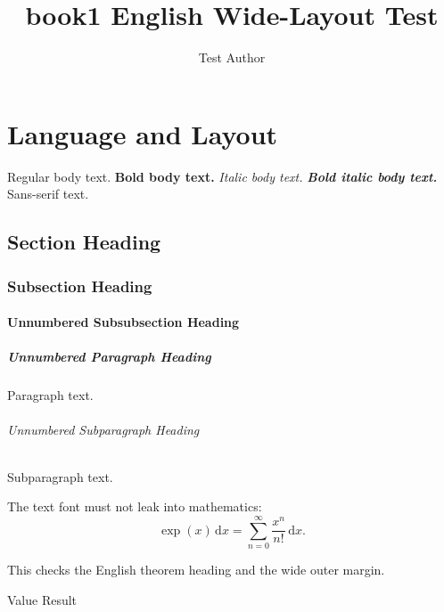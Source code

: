 \documentclass[11pt,a4paper,openright]{book}
\title{book1 English Wide-Layout Test}
\author{Test Author}
\begin{document}
\maketitle
\chapter{Language and Layout}

Regular body text. \textbf{Bold body text.}
\textit{Italic body text.} \textbf{\textit{Bold italic body text.}}
\textsf{Sans-serif text.}

\section{Section Heading}

\subsection{Subsection Heading}

\subsubsection{Unnumbered Subsubsection Heading}

\paragraph{Unnumbered Paragraph Heading}
Paragraph text.

\subparagraph{Unnumbered Subparagraph Heading}
Subparagraph text.

The text font must not leak into mathematics:
\[
  \exp(x)\,\mathrm{d}x
  = \sum_{n=0}^{\infty}\frac{x^n}{n!}\,\mathrm{d}x.
\]

\begin{theorem}[Heading]
This checks the English theorem heading and the wide outer margin.
\end{theorem}

\begin{algorithm}
  \caption{Input and output headings}
  \begin{algorithmic}
    \AlgInput Value
    \AlgOutput Result
  \end{algorithmic}
\end{algorithm}
\end{document}
